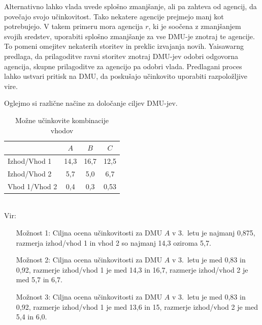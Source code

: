 \documentclass[12pt,a4paper]{article}
\theoremstyle{definition}
\begin{document}
Alternativno lahko vlada uvede splošno zmanjšanje, ali
pa zahteva od agencij, da povečajo svojo učinkovitost.
Tako nekatere agencije prejmejo manj kot potrebujejo.
V takem primeru mora agencija $r$, ki je soočena z 
zmanjšanjem svojih sredstev, uporabiti splošno
zmanjšanje za vse DMU-je znotraj te agencije. To
pomeni omejitev nekaterih storitev in preklic
izvajanja novih. \mbox{Yaisawarng} predlaga, da
prilagoditve ravni storitev znotraj DMU-jev odobri
odgovorna agencija, skupne prilagoditve za agencijo
pa odobri vlada. Predlagani proces lahko ustvari 
pritisk na DMU, da poskušajo učinkovito uporabiti 
razpoložljive vire. 
\cite{Yaisawarng2002}

Oglejmo si različne načine za določanje ciljev DMU-jev.

\begin{table}[H]
    \centering
    \caption{Možne učinkovite kombinacije vhodov}
    \label{table:dmu_primer}
    \begin{tabular}{|l|c|c|c|}
    \hline
    & $A$ & $B$ & $C$ \\
    \hline
    Izhod/Vhod 1 & 14,3 & 16,7 & 12,5 \\
    Izhod/Vhod 2 & 5,7 & 5,0 & 6,7 \\
    Vhod 1/Vhod 2 & 0,4 & 0,3 & 0,53 \\
    \hline
    \end{tabular}
    \\ \vspace{0.2em}
    \footnotesize{Vir: \cite{Yaisawarng2002}}
\end{table}
    
\newpage

\begin{enumerate}
    \item[Možnost 1:] Ciljna ocena učinkovitosti za 
    DMU $A$ v 3.\ letu je najmanj 0{,}875, razmerja 
    izhod/vhod 1 in vhod 2 so najmanj 14,3 oziroma 5,7.
    
    \item[Možnost 2:] Ciljna ocena učinkovitosti za DMU
    $A$ v 3.\ letu je med 0{,}83 in 0{,}92, razmerje 
    izhod/vhod 1 je med 14,3 in 16,7, razmerje izhod/vhod 
    2 je med 5{,}7 in 6{,}7.
    
    \item[Možnost 3:] Ciljna ocena učinkovitosti za DMU
    $A$ v 3.\ letu je med 0{,}83 in 0{,}92, razmerje 
    izhod/vhod 1 je med 13{,}6 in 15, razmerje 
    izhod/vhod 2 je med 5{,}4 in 6{,}0.
\end{enumerate}
\end{document}
